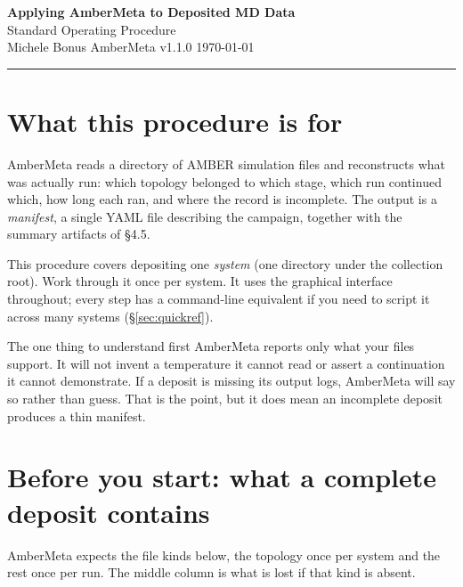 \documentclass[11pt]{article}
\begin{document}
\begin{center}
  {\LARGE\bfseries\color{amber} Applying AmberMeta to Deposited MD Data}\\[0.5em]
  {\large Standard Operating Procedure}\\[1.1em]
  {\small Michele Bonus \quad\textbullet\quad AmberMeta v1.1.0 \quad\textbullet\quad \today}
\end{center}
\vspace{0.8em}
\hrule
\vspace{1.4em}

\section{What this procedure is for}

AmberMeta reads a directory of AMBER simulation files and reconstructs what was
actually run: which topology belonged to which stage, which run continued which, how
long each ran, and where the record is incomplete. The output is a \emph{manifest}, a
single YAML file describing the campaign, together with the summary artifacts of \S4.5.

This procedure covers depositing one \emph{system} (one directory under the collection
root). Work through it once per system. It uses the graphical interface throughout;
every step has a command-line equivalent if you need to script it across many systems
(\S\ref{sec:quickref}).

\begin{note}{The one thing to understand first}
AmberMeta reports only what your files support. It will not invent a temperature it
cannot read or assert a continuation it cannot demonstrate. If a deposit is missing its
output logs, AmberMeta will say so rather than guess. That is the point, but it does
mean an incomplete deposit produces a thin manifest.
\end{note}

\section{Before you start: what a complete deposit contains}
\label{sec:prereq}

AmberMeta expects the file kinds below, the topology once per system and the rest once
per run. The middle column is what is lost if that kind is absent.
\end{document}
